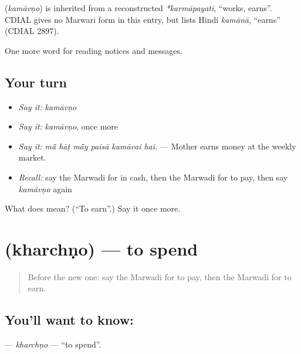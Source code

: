 \begin{cousinweb}
\textbf{} (\emph{kamāvṇo}) is inherited from a reconstructed \emph{*karmāpayati}, \textquotedblleft{}works, earns\textquotedblright{}. CDIAL gives no Marwari form in this entry, but lists Hindi \emph{kamānā}, \textquotedblleft{}earns\textquotedblright{} (CDIAL 2897).
\end{cousinweb}

\begin{grammarlens}[title={What you've built}]
One more word for reading notices and messages.
\end{grammarlens}

\subsection*{Your turn}
\begin{itemize}
\raggedright
  \item \emph{Say it:} \emph{kamāvṇo}
  \item \emph{Say it:} \emph{kamāvṇo}, once more
  \item \emph{Say it:} \emph{mā̃ hāṭ mā̃y paisā kamāvai hai.} — Mother earns money at the weekly market.
  \item \emph{Recall:} say the Marwadi for in cash, then the Marwadi for to pay, then say \emph{kamāvṇo} again
\end{itemize}

\begin{tcolorbox}[breakable,colback=teal!4,colframe=teal!35!black,title={Before you move on}]
What does  mean? (\textquotedblleft{}To earn\textquotedblright{}.) Say it once more.
\end{tcolorbox}
\section[\texorpdfstring{\mw{खरचणो} (kharchṇo)}{खरचणो (kharchṇo)}]{ (kharchṇo) — to spend}

\label{lesson:MW-C194-kharchno}



\begin{quote}
Before the new one: say the Marwadi for to pay, then the Marwadi for to earn.
\end{quote}

\subsection*{You'll want to know: }
\textbf{} — \emph{kharchṇo} — \textquotedblleft{}to spend\textquotedblright{}.

